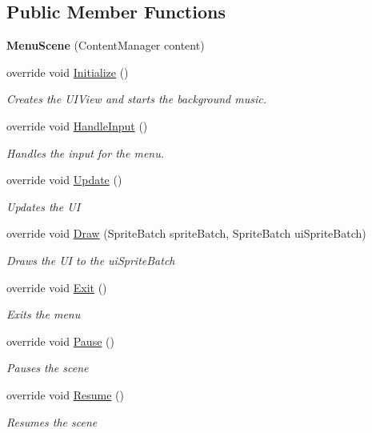 \subsection*{Public Member Functions}
\begin{DoxyCompactItemize}
\item 
\hypertarget{class_midnight_blue_1_1_menu_scene_a7f0035320ea63bd527efcdbda32d3f2b}{}\label{class_midnight_blue_1_1_menu_scene_a7f0035320ea63bd527efcdbda32d3f2b} 
{\bfseries Menu\+Scene} (Content\+Manager content)
\item 
override void \hyperlink{class_midnight_blue_1_1_menu_scene_ab46d90617acf2fad0a3c759337c54aaf}{Initialize} ()
\begin{DoxyCompactList}\small\item\em Creates the U\+I\+View and starts the background music. \end{DoxyCompactList}\item 
override void \hyperlink{class_midnight_blue_1_1_menu_scene_a34d30a2b66e9eadbf0889071bca6fa57}{Handle\+Input} ()
\begin{DoxyCompactList}\small\item\em Handles the input for the menu. \end{DoxyCompactList}\item 
override void \hyperlink{class_midnight_blue_1_1_menu_scene_af82ad49ba2744422e52fc6c1b8544255}{Update} ()
\begin{DoxyCompactList}\small\item\em Updates the UI \end{DoxyCompactList}\item 
override void \hyperlink{class_midnight_blue_1_1_menu_scene_a600112073f48c763a50c802960f5fdaa}{Draw} (Sprite\+Batch sprite\+Batch, Sprite\+Batch ui\+Sprite\+Batch)
\begin{DoxyCompactList}\small\item\em Draws the UI to the ui\+Sprite\+Batch \end{DoxyCompactList}\item 
override void \hyperlink{class_midnight_blue_1_1_menu_scene_acc60288dc2dff4d612b7a63615165de5}{Exit} ()
\begin{DoxyCompactList}\small\item\em Exits the menu \end{DoxyCompactList}\item 
override void \hyperlink{class_midnight_blue_1_1_menu_scene_a7a2f8875f949d2ec2e6f3a8c6da7cedf}{Pause} ()
\begin{DoxyCompactList}\small\item\em Pauses the scene \end{DoxyCompactList}\item 
override void \hyperlink{class_midnight_blue_1_1_menu_scene_a76f8bd3add4abf16ac9962a2fb51fad2}{Resume} ()
\begin{DoxyCompactList}\small\item\em Resumes the scene \end{DoxyCompactList}\end{DoxyCompactItemize}
